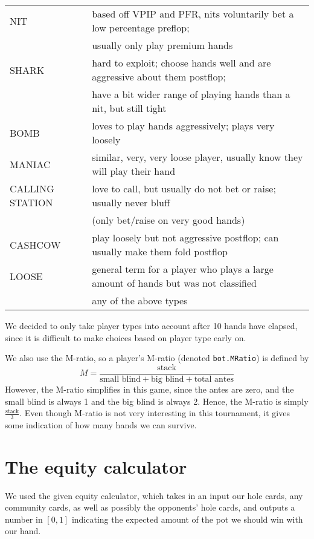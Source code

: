 \documentclass{article}
\begin{document}
\begin{tabular}{|l|l|} \hline
NIT & based off VPIP and PFR, nits voluntarily bet a low percentage preflop; \\
 & usually only play premium hands \\ \hline
SHARK & hard to exploit; choose hands well and are aggressive about them postflop; \\
&  have a bit wider range of playing hands than a nit, but still tight \\ \hline
BOMB & loves to play hands aggressively; plays very loosely \\ \hline
MANIAC & similar, very, very loose player, usually know they will play their hand \\ \hline
CALLING STATION & love to call, but usually do not bet or raise; usually never bluff \\
& (only bet/raise on very good hands) \\ \hline
CASHCOW & play loosely but not aggressive postflop; can usually make them fold postflop \\ \hline
LOOSE & general term for a player who plays a large amount of hands but was not classified \\
& any of the above types \\ \hline
\end{tabular}

\vspace{.5in}

We decided to only take player types into account after 10 hands have elapsed, since it is difficult to make choices based on player type early on.





We also use the M-ratio, so a player's M-ratio (denoted \texttt{bot.MRatio}) is defined by
\[ M = \frac{\text{stack}}{\text{small blind} + \text{big blind} + \text{total antes}} \]
However, the M-ratio simplifies in this game, since the antes are zero, and the small blind is always 1 and the big blind is always 2. Hence, the M-ratio is simply $\frac{\text{stack}}{3}$. Even though M-ratio is not very interesting in this tournament, it gives some indication of how many hands we can survive.

\section*{The equity calculator}
We used the given equity calculator, which takes in an input our hole cards, any community cards, as well as possibly the opponents' hole cards, and outputs a number in $[0,1]$ indicating the expected amount of the pot we should win with our hand.
\end{document}
